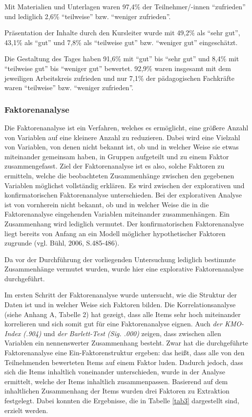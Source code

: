 \documentclass[12pt,a4paper]{article}
\begin{document}
Mit Materialien und Unterlagen waren 97,4\% der Teilnehmer/-innen "`zufrieden"' und lediglich 2,6\% "`teilweise"' bzw. "`weniger zufrieden"'. 

Präsentation der Inhalte durch den Kursleiter wurde mit 49,2\% als "`sehr gut"', 43,1\% als "`gut"' und 7,8\% als "`teilweise gut"' bzw. "`weniger gut"' eingeschätzt. 

Die Gestaltung des Tages haben 91,6\% mit "`gut"' bis "`sehr gut"' und 8,4\% mit "`teilweise gut"' bis "`weniger gut"' bewertet. 92,9\% waren insgesamt mit dem jeweiligen Arbeitskreis zufrieden und nur 7,1\% der pädagogischen Fachkräfte waren "`teilweise"' bzw. "`weniger zufrieden"'.

\subsubsection{Faktorenanalyse}

Die Faktorenanalyse ist ein Verfahren, welches es ermöglicht, eine größere Anzahl von Variablen auf eine kleinere Anzahl zu reduzieren. Dabei wird eine Vielzahl von Variablen, von denen nicht bekannt ist, ob und in welcher Weise sie etwas miteinander gemeinsam haben, in Gruppen aufgeteilt und zu einem Faktor zusammengefasst. Ziel der Faktorenanalyse ist es also, solche Faktoren zu ermitteln, welche die beobachteten Zusammenhänge zwischen den gegebenen Variablen möglichst vollständig erklären. Es wird zwischen der explorativen und konfirmatorischen Faktorenanalyse unterschieden. Bei der explorativen Analyse ist von vornherein nicht bekannt, ob und in welcher Weise die in die Faktorenanalyse eingehenden Variablen miteinander zusammenhängen. Ein Zusammenhang wird lediglich vermutet. Der konfirmatorischen Faktorenanalyse liegt bereits von Anfang an ein Modell möglicher hypothetischer Faktoren zugrunde (vgl. Bühl, 2006, S.485-486). 

Da vor der Durchführung der  vorliegenden Untersuchung lediglich bestimmte Zusammenhänge vermutet wurden, wurde hier eine explorative Faktorenanalyse durchgeführt. 

Im ersten Schritt der Faktorenanalyse wurde untersucht, wie die Struktur der Daten ist und in welcher Weise sich Faktoren bilden. Die Korrelationsanalyse (siehe Anhang A, Tabelle 2)
hat gezeigt, dass alle Items sehr hoch miteinander korrelieren und sich somit gut für eine Faktorenanalyse eignen. Auch \textit{der KMO-Index (.904)} und \textit{der Barlett-Test (Sig. .000)} zeigen, dass zwischen allen Variablen ein nennenswerter Zusammenhang besteht. Zwar hat die durchgeführte Faktorenanalyse eine Ein-Faktorenstruktur ergeben: das heißt, dass alle von den Teilnehmenden bewerteten Items auf einem Faktor luden. Dadurch jedoch, dass sich die Items inhaltlich voneinander unterschieden, wurde in der Analyse ermittelt, welche der Items inhaltlich zusammenpassen. Basierend auf dem inhaltlichen Zusammenhang der Items wurden drei Faktoren zu Extraktion festgelegt. Dabei konnten die Ergebnisse, die in Tabelle \ref{tab3} dargestellt sind, erzielt werden.
\end{document}

